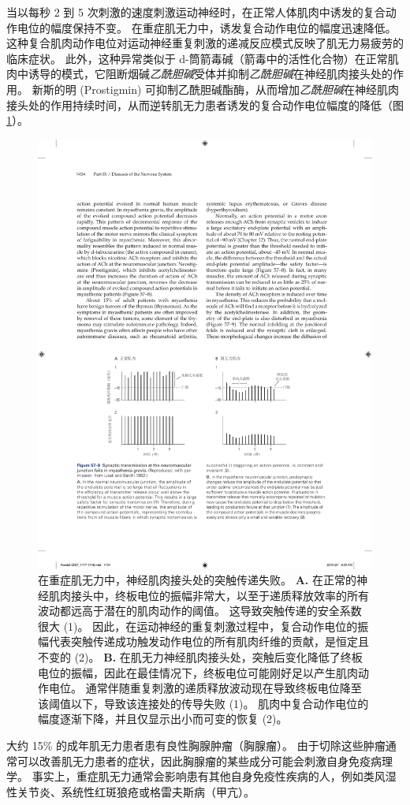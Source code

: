 当以每秒 2 到 5 次刺激的速度刺激运动神经时，在正常人体肌肉中诱发的复合动作电位的幅度保持不变。
在重症肌无力中，诱发复合动作电位的幅度迅速降低。
这种复合肌肉动作电位对运动神经重复刺激的递减反应模式反映了肌无力易疲劳的临床症状。
此外，这种异常类似于 d-筒箭毒碱（箭毒中的活性化合物）在正常肌肉中诱导的模式，它阻断烟碱\textit{乙酰胆碱}受体并抑制\textit{乙酰胆碱}在神经肌肉接头处的作用。
新斯的明 (Prostigmin) 可抑制乙酰胆碱酯酶，从而增加\textit{乙酰胆碱}在神经肌肉接头处的作用持续时间，从而逆转肌无力患者诱发的复合动作电位幅度的降低（图 \ref{fig:57_8}）。


\begin{figure}[htbp]
	\centering
	\includegraphics[width=0.7\linewidth]{chap57/fig_57_8}
	\caption{在重症肌无力中，神经肌肉接头处的突触传递失败。
		\textbf{A.} 在正常的神经肌肉接头中，终板电位的振幅非常大，以至于递质释放效率的所有波动都远高于潜在的肌肉动作的阈值。
		这导致突触传递的安全系数很大 (1)。
		因此，在运动神经的重复刺激过程中，复合动作电位的振幅代表突触传递成功触发动作电位的所有肌肉纤维的贡献，是恒定且不变的 (2)。
		\textbf{B.} 在肌无力神经肌肉接头处，突触后变化降低了终板电位的振幅，因此在最佳情况下，终板电位可能刚好足以产生肌肉动作电位。
		通常伴随重复刺激的递质释放波动现在导致终板电位降至该阈值以下，导致该连接处的传导失败 (1)。
		肌肉中复合动作电位的幅度逐渐下降，并且仅显示出小而可变的恢复 (2)。}
	\label{fig:57_8}
\end{figure}


大约 15\% 的成年肌无力患者患有良性胸腺肿瘤（胸腺瘤）。
由于切除这些肿瘤通常可以改善肌无力患者的症状，因此胸腺瘤的某些成分可能会刺激自身免疫病理学。
事实上，重症肌无力通常会影响患有其他自身免疫性疾病的人，例如类风湿性关节炎、系统性红斑狼疮或格雷夫斯病（甲亢）。


